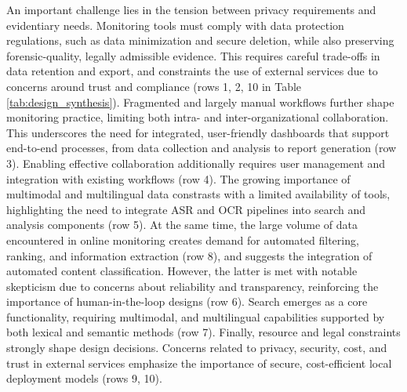 \documentclass[acmsmall]{acmart}
\begin{document}
An important challenge lies in the tension between privacy requirements and evidentiary needs. Monitoring tools must comply with data protection regulations, such as data minimization and secure deletion, while also preserving forensic-quality, legally admissible evidence. This requires careful trade-offs in data retention and export, and constraints the use of external services due to concerns around trust and compliance (rows 1, 2, 10 in Table \ref{tab:design_synthesis}). 
Fragmented and largely manual workflows further shape monitoring practice, limiting both intra- and inter-organizational collaboration. This underscores the need for integrated, user-friendly dashboards that support end-to-end processes, from data collection and analysis to report generation (row 3). Enabling effective collaboration additionally requires user management and  integration with existing workflows (row 4). 
The growing importance of multimodal and multilingual data constrasts with a limited availability of tools, highlighting the need to integrate ASR and OCR pipelines into search and analysis components (row 5). 
At the same time, the large volume of data encountered in online monitoring creates demand for automated filtering, ranking, and information extraction (row 8), and suggests the integration of automated content classification. However, the latter is met with notable skepticism due to concerns about reliability and transparency, reinforcing the importance of human-in-the-loop designs (row 6). 
Search emerges as a core functionality, requiring multimodal, and multilingual capabilities supported by both lexical and semantic methods (row 7).
Finally, resource and legal constraints strongly shape design decisions. Concerns related to privacy, security, cost, and trust in external services emphasize the importance of secure, cost-efficient local deployment models (rows 9, 10).
\end{document}
